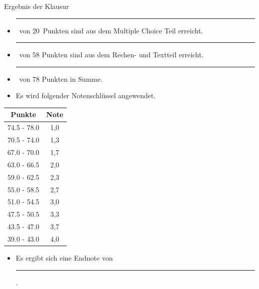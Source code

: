 \documentclass[a4paper, 10pt]{scrartcl}\usepackage[]{graphicx}\usepackage[]{xcolor}
\begin{document}
\begin{graybox}{Ergebnis der Klausur}
  \vspace{1Ex}
  \begin{itemize}
  \item[] \rule[0ex]{3em}{.4pt}\, von 20\, Punkten sind aus dem Multiple
    Choice Teil erreicht.
  \item[] \rule[0ex]{3em}{.4pt}\, von 58 Punkten sind aus dem Rechen- und
    Textteil erreicht. 
  \item[] \rule[0ex]{3em}{.4pt}\, von 78 Punkten in Summe.
  \item[] Es wird folgender Notenschlüssel angewendet.   
  \end{itemize}
  \vspace{1ex}
\begin{center}
  \begin{tabular}[c]{cc}
    \toprule
    \textbf{Punkte}	&	\textbf{Note}	\\
    \midrule
    74.5 - 78.0	&	1,0	\\
    70.5 - 74.0	&	1,3	\\
    67.0 - 70.0	&	1,7	\\
    63.0 - 66.5	&	2,0	\\
    59.0 - 62.5	&	2,3	\\
    55.0 - 58.5	&	2,7	\\
    51.0 - 54.5	&	3,0	\\
    47.5 - 50.5	&	3,3	\\
    43.5 - 47.0	&	3,7	\\
    39.0 - 43.0	&	4,0	\\
    \bottomrule
  \end{tabular}
\end{center}
  \vspace{1ex}
\begin{itemize}
\item[] Es ergibt sich eine Endnote von \rule[0ex]{4em}{.4pt}.
\end{itemize}
  \vspace{1Ex}
\end{graybox}

\newpage
\end{document}
